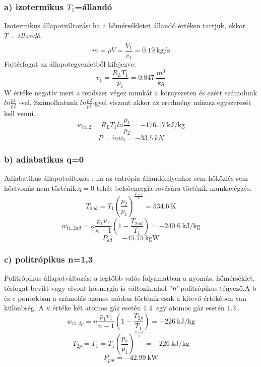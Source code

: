 \subsubsection{a) izotermikus $T_1$=állandó}
Izotermikus állapotváltozás: ha a hőmérsékletet állandó értéken tartjuk, ekkor $T=állandó$.
\begin{equation}
\dot{m}=\rho \dot{V}=\frac{\dot{V_1}}{v_1}=\SI{0,19}{\kilogram\per\second}
\end{equation}
Fajtérfogat az állapotegyenletből kifejezve:
\begin{equation}
v_1=\frac{R_L T_1}{p_1}=\SI{0,847}{\frac{m^3}{kg}}
\end{equation}
W értéke negatív mert a rendszer végez munkát a környezeten és ezért számolunk $ln\frac{p1}{p2}$ -vel. Számolhatunk $ln\frac{p2}{p1}$-gyel viszont akkor az eredmény mínusz egyszeresét kell venni.
\begin{equation}
w_{t1,2}=R_LT_1ln\frac{p_1}{p_2}=\SI{-176,17}{\kilo\joule\per\kilogram}
\end{equation}
\begin{equation}
P=\dot{m}w_t=\SI{-33,5}{kN}
\end{equation}

\subsubsection{b) adiabatikus q=0}
Adiabatikus állapotváltozás : ha az entrópia állandó.Ilyenkor sem hőközlés sem hőelvonás nem történik.$q=0$ tehát belsőenergia rovására történik munkavégzés.
\begin{equation}
T_{2ad}=T_1\left(\frac{p_2}{p_1}\right)^\frac{\kappa-1}{\kappa}=\SI{534,6}{\kelvin}
\end{equation}
\begin{equation}
w_{t1,2ad}=\kappa\frac{p_1v_1}{\kappa-1}\left(1-\frac{T_{2ad}}{T_1}\right)=\SI{-240,6}{\kilo\joule\per\kilogram}
\end{equation}
\begin{equation}
P_{ad}=\SI{-45,75}{\kilogram\watt}
\end{equation}

\subsubsection{c) politrópikus n=1,3}
Politrópikus állapotváltozás: a legtöbb valós folyamatban a nyomás, hőmérséklet, térfogat bevitt vagy elvont hőenergia is változik.ahol $"n"$politrópikus tényező.A b és c pontokban a számolás azonos módon történik csak a kitevő értékében van különbség.
A $\kappa$ értéke két atomos gáz esetén $\SI{1,4}{}$ egy atomos gáz esetén $\SI{1,3}{}$.
\begin{equation}
w_{t1,2p}=n\frac{p_1v_1}{n-1}\left(1-\frac{T_{2p}}{T_1}\right)=\SI{-226}{\kilo\joule\per\kilogram}
\end{equation}
\begin{equation}
T_{2p}=T_1=T_1\left(\frac{p_2}{p_1}\right)^\frac{n-1}{n}=\SI{-226}{\kilo\joule\per\kilogram}
\end{equation}
\begin{equation}
P_{pol}=\SI{-42,99}{\kilo\watt}
\end{equation}


